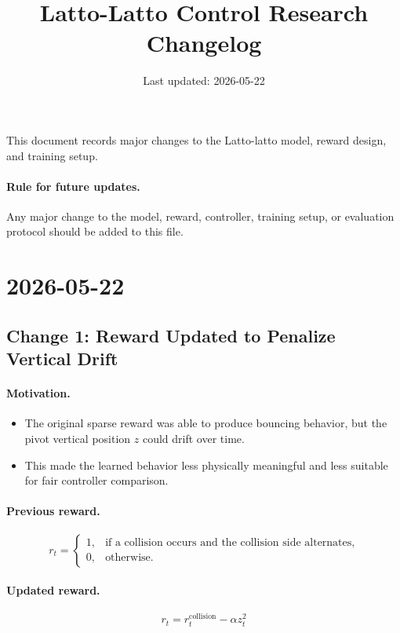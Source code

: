 \documentclass[11pt]{article}
\title{Latto-Latto Control Research Changelog}
\author{}
\date{Last updated: 2026-05-22}
\begin{document}
\maketitle

This document records major changes to the Latto-latto model, reward design, and training setup.

\paragraph{Rule for future updates.}
Any major change to the model, reward, controller, training setup, or evaluation protocol should be added to this file.

\section*{2026-05-22}

\subsection*{Change 1: Reward Updated to Penalize Vertical Drift}

\paragraph{Motivation.}
\begin{itemize}[leftmargin=1.5em]
  \item The original sparse reward was able to produce bouncing behavior, but the pivot vertical position $z$ could drift over time.
  \item This made the learned behavior less physically meaningful and less suitable for fair controller comparison.
\end{itemize}

\paragraph{Previous reward.}
\[
r_t =
\begin{cases}
1, & \text{if a collision occurs and the collision side alternates}, \\
0, & \text{otherwise.}
\end{cases}
\]

\paragraph{Updated reward.}
\[
r_t = r_t^{\mathrm{collision}} - \alpha z_t^2
\]
\end{document}
